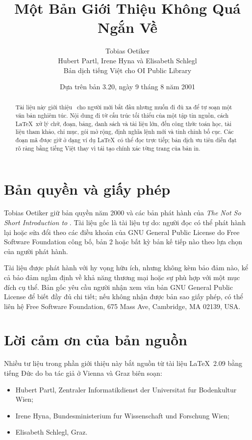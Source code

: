 \documentclass[11pt]{article}
\title{Một Bản Giới Thiệu Không Quá Ngắn Về \LaTeXe}
\author{Tobias Oetiker\\
Hubert Partl, Irene Hyna và Elisabeth Schlegl\\[0.4em]
Bản dịch tiếng Việt cho OI Public Library}
\date{Dựa trên bản 3.20, ngày 9 tháng 8 năm 2001}
\newcommand{\Lshort}{\textit{The Not So Short Introduction to \LaTeXe}}
\begin{document}
\maketitle

\renewcommand{\figurename}{Hình}


\begin{abstract}
Tài liệu này giới thiệu \LaTeXe\ cho người mới bắt đầu nhưng muốn đi đủ xa để
tự soạn một văn bản nghiêm túc. Nội dung đi từ cấu trúc tối thiểu của một tập
tin nguồn, cách \LaTeX\ xử lý chữ, đoạn, bảng, danh sách và tài liệu lớn, đến
công thức toán học, tài liệu tham khảo, chỉ mục, gói mở rộng, định nghĩa lệnh
mới và tinh chỉnh bố cục. Các đoạn mã được giữ ở dạng ví dụ \LaTeX\ có thể đọc
trực tiếp; bản dịch ưu tiên diễn đạt rõ ràng bằng tiếng Việt thay vì tái tạo
chính xác từng trang của bản in.
\end{abstract}

\section*{Bản quyền và giấy phép}

Tobias Oetiker giữ bản quyền năm 2000 và các bản phát hành của \Lshort. Tài
liệu gốc là tài liệu tự do: người đọc có thể phát hành lại hoặc sửa đổi theo
các điều khoản của GNU General Public License do Free Software Foundation công
bố, bản 2 hoặc bất kỳ bản kế tiếp nào theo lựa chọn của người phát hành.

Tài liệu được phát hành với hy vọng hữu ích, nhưng không kèm bảo đảm nào, kể
cả bảo đảm ngầm định về khả năng thương mại hoặc sự phù hợp với một mục đích
cụ thể. Bản gốc yêu cầu người nhận xem văn bản GNU General Public License để
biết đầy đủ chi tiết; nếu không nhận được bản sao giấy phép, có thể liên hệ
Free Software Foundation, 675 Mass Ave, Cambridge, MA 02139, USA.

\section*{Lời cảm ơn của bản nguồn}

Nhiều tư liệu trong phần giới thiệu này bắt nguồn từ tài liệu \LaTeX~2.09 bằng
tiếng Đức do ba tác giả ở Vienna và Graz biên soạn:
\begin{itemize}
  \item Hubert Partl, Zentraler Informatikdienst der Universitat fur
        Bodenkultur Wien;
  \item Irene Hyna, Bundesministerium fur Wissenschaft und Forschung Wien;
  \item Elisabeth Schlegl, Graz.
\end{itemize}
\end{document}
